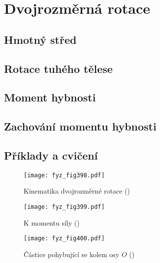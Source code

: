 \chapter{Dvojrozměrná rotace}\label{fyz:IchapXVIII}
\minitoc
\section{Hmotný střed}\label{fyz:IchapXVIIIsecI}
\section{Rotace tuhého tělese}\label{fyz:IchapXVIIIsecII}
\section{Moment hybnosti}\label{fyz:IchapXVIIIsecIII}
\section{Zachování momentu hybnosti}\label{fyz:IchapXVIIIsecIV}
\section{Příklady a cvičení}\label{fyz:IchapXVIIIsecVI}

  \begin{figure}[ht!] %
    \centering
    \texttt{[image: fyz\_fig398.pdf]}
    \caption{Kinematika dvojrozměrné rotace
             (\cite[s.~251]{Feynman01})}
    \label{fyz_fig398}
  \end{figure}

  \begin{figure}[ht!] %
    \centering
    \texttt{[image: fyz\_fig399.pdf]}
    \caption{K momentu síly
             (\cite[s.~253]{Feynman01})}
    \label{fyz_fig399}
  \end{figure}

  \begin{figure}[ht!] %
    \centering
    \texttt{[image: fyz\_fig400.pdf]}
    \caption{Částice pohybující se kolem osy \(O\)
             (\cite[s.~254]{Feynman01})}
    \label{fyz_fig400}
  \end{figure}

